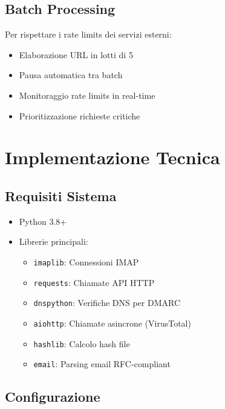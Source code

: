 \documentclass{article}
\begin{document}
\subsection{Batch Processing}

Per rispettare i rate limits dei servizi esterni:

\begin{itemize}
    \item Elaborazione URL in lotti di 5
    \item Pausa automatica tra batch
    \item Monitoraggio rate limits in real-time
    \item Prioritizzazione richieste critiche
\end{itemize}

\section{Implementazione Tecnica}

\subsection{Requisiti Sistema}

\begin{itemize}
    \item Python 3.8+
    \item Librerie principali:
    \begin{itemize}
        \item \texttt{imaplib}: Connessioni IMAP
        \item \texttt{requests}: Chiamate API HTTP
        \item \texttt{dnspython}: Verifiche DNS per DMARC
        \item \texttt{aiohttp}: Chiamate asincrone (VirusTotal)
        \item \texttt{hashlib}: Calcolo hash file
        \item \texttt{email}: Parsing email RFC-compliant
    \end{itemize}
\end{itemize}

\subsection{Configurazione}
\end{document}
